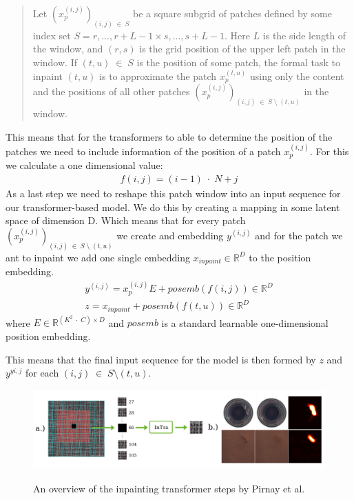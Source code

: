 \begin{quote}
Let $(x_p^{(i,j)})_{(i,j) \;\in\; S}$ be a square subgrid of patches defined by some index set $S = {r,...,r+L-1} \times {s,...,s+L-1}$. Here $L$ is the side length of the window, and $(r,s)$ is the grid position of the upper left patch in the window. If $(t, u) \;\in\; S$ is the position of some patch, the formal task to inpaint $(t,u)$ is to approximate the patch $x_p^{(t,u)}$ using only the content and the positions of all other patches $(x_p^{(i,j)})_{(i,j) \;\in\; S \;\setminus\; {(t,u)}}$ in the window.
\end{quote}

This means that for the transformers to able to determine the position of the patches we need to include information of the position of a patch $x_p^{(i,j)}$. For this we calculate a one dimensional value:
%
\begin{align}
f(i,j) = (i-1) \;\cdot\; N + j 
\end{align}
%
As a last step we need to reshape this patch window into an input sequence for our transformer-based model. We do this by creating a mapping in some latent space of dimension D. Which means that for every patch $(x_p^{(i,j)})_{(i,j) \;\in\; S \;\setminus\; {(t,u)}}$ we create and embedding $y^(i,j)$ and for the patch we ant to inpaint we add one single embedding $x_{inpaint} \in \mathbb{R}^D$ to the position embedding.
%
\begin{align}
y^(i,j) = x_p^{(i,j)}E + posemb(f(i, j)) \in \mathbb{R}^D\\
z = x_{inpaint} + posemb(f(t, u)) \in \mathbb{R}^D
\end{align}
%
where $E \in \mathbb{R}^{(K^2 \;\cdot\; C) \times D}$ and $posemb$ is a standard learnable one-dimensional position embedding.

This means that the final input sequence for the model is then formed by $z$ and $y^{yi, j}$ for each $(i, j) \;\in\; S \setminus {(t,u)}$.

\begin{figure}[ht!]
\caption{An overview of the inpainting transformer steps by Pirnay et al. \cite{pirnay_inpainting_2021}}
\centering
\includegraphics[width=\textwidth]{imgs/intra-overview.png}
\label{fig:experimental-setup:intra-overview}
\end{figure}

